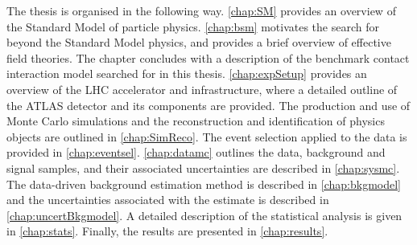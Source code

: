 The thesis is organised in the following way. \cref{chap:SM} provides an overview of the Standard Model of particle physics. \cref{chap:bsm} motivates the search for beyond the Standard Model physics, and provides a brief overview of effective field theories. The chapter concludes with a description of the benchmark contact interaction model searched for in this thesis. \cref{chap:expSetup} provides an overview of the LHC accelerator and infrastructure, where a detailed outline of the ATLAS detector and its components are provided. The production and use of Monte Carlo simulations and the reconstruction and identification of physics objects are outlined in \cref{chap:SimReco}. The event selection applied to the data is provided in \cref{chap:eventsel}. \cref{chap:datamc} outlines the data, background and signal samples, and their associated uncertainties are described in \cref{chap:sysmc}. The data-driven background estimation method is described in \cref{chap:bkgmodel} and the uncertainties associated with the estimate is described in \cref{chap:uncertBkgmodel}. A detailed description of the statistical analysis is given in \cref{chap:stats}. Finally, the results are presented in \cref{chap:results}. 